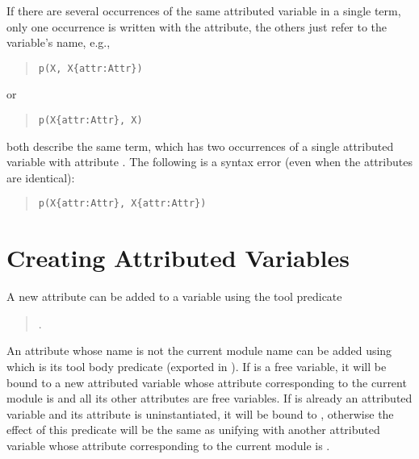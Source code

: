 If there are several occurrences of the same attributed variable in a single
term,
only one occurrence is written with the attribute,
the others just refer to the variable's name,
e.g.,
\begin{quote}
\begin{verbatim}
p(X, X{attr:Attr})
\end{verbatim}
\end{quote}
or
\begin{quote}
\begin{verbatim}
p(X{attr:Attr}, X)
\end{verbatim}
\end{quote}
both describe the same term, which has two occurrences of a single attributed
variable
with attribute .
The following is a syntax error (even when the attributes are identical):
\begin{quote}
\begin{verbatim}
p(X{attr:Attr}, X{attr:Attr})
\end{verbatim}
\end{quote}


\section{Creating Attributed Variables}
A new attribute can be added to a variable
using the tool predicate
\begin{quote}
.%
\end{quote}
An attribute whose name is not the current module name
can be added using
 which
is its tool
body predicate (exported in ).
If  is a free variable, it will be bound to a new attributed variable
whose attribute corresponding to the current module is
 and all its other attributes are free variables.
If  is already an attributed variable and its attribute is
uninstantiated,
it will be bound to , otherwise the effect of this predicate
will be the same as unifying  with another attributed variable
whose attribute corresponding to the current module is
.

